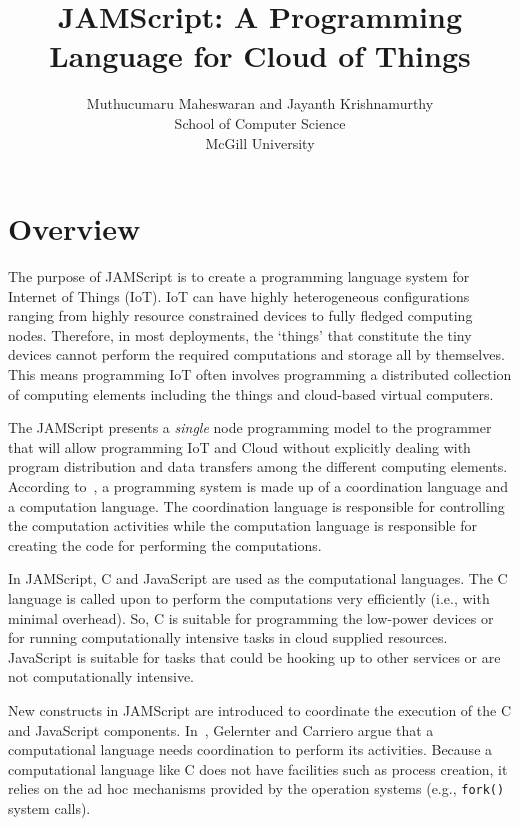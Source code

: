 \documentclass[11pt]{article}
\title{JAMScript: A Programming Language for Cloud of Things}
\author{Muthucumaru Maheswaran and Jayanth Krishnamurthy \\ School of Computer Science \\ McGill University}
\begin{document}
\maketitle

\section{Overview}


The purpose of JAMScript is to create a programming language system for Internet
of Things (IoT). IoT can have highly heterogeneous configurations ranging from
highly resource constrained devices to fully fledged computing nodes. Therefore,
in most deployments, the `things' that constitute the tiny devices cannot
perform the required computations and storage all by themselves. This means
programming IoT often involves programming a distributed collection of computing
elements including the things and cloud-based virtual computers.

The JAMScript presents a {\em single} node programming model to the programmer
that will allow programming IoT and Cloud without explicitly dealing with
program distribution and data transfers among the different computing elements.
According to~\cite{Gelernter:1992hz}, a programming system is made up of a
coordination language and a computation language. The coordination language is
responsible for controlling the computation activities while the computation
language is responsible for creating the code for performing the computations.

In JAMScript, C and JavaScript are used as the computational languages. The C
language is called upon to perform the computations very efficiently (i.e., with
minimal overhead). So, C is suitable for programming the low-power devices or
for running computationally intensive tasks in cloud supplied resources.
JavaScript is suitable for tasks that could be hooking up to other services or
are not computationally intensive.

New constructs in JAMScript are introduced to coordinate the execution of the C
and JavaScript components. In~\cite{Gelernter:1992hz}, Gelernter and Carriero
argue that a computational language needs coordination to perform its
activities. Because a computational language like C does not have facilities
such as process creation, it relies on the ad hoc mechanisms provided by the
operation systems (e.g., {\tt fork()} system calls).
\end{document}
